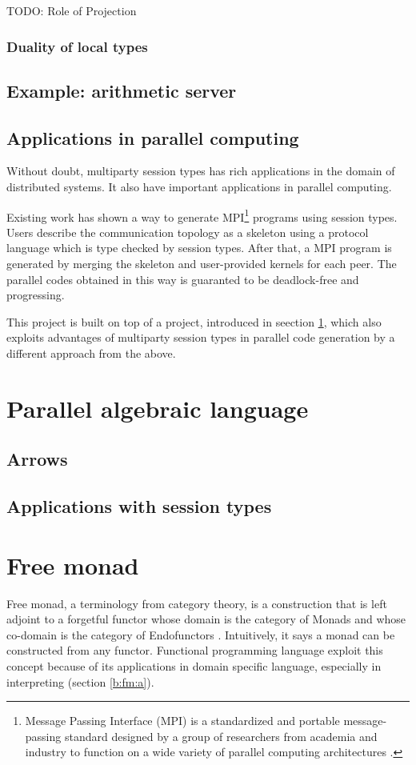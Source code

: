 TODO: Role of Projection
\subsubsection{Duality of local types}
\subsection{Example: arithmetic server}
\subsection{Applications in parallel computing}
Without doubt, multiparty session types has rich applications in the domain of distributed systems. It also have important applications in parallel computing. 

Existing work\cite{ngSafeMPICode} has shown a way to generate MPI\footnote{Message Passing Interface (MPI) is a standardized and portable message-passing standard designed by a group of researchers from academia and industry to function on a wide variety of parallel computing architectures \cite{MessagePassingInterface2018}.} programs using session types. Users describe the communication topology as a skeleton using a protocol language which is type checked by session types. After that, a MPI program is generated by merging the skeleton and user-provided kernels for each peer. The parallel codes obtained in this way is guaranted to be deadlock-free and progressing. 

This project is built on top of a project, introduced in seection \ref{b:pal}, which also exploits advantages of multiparty session types in parallel code generation by a different approach from the above.
\section{Parallel algebraic language} \label{b:pal}
\subsection{Arrows}
\subsection{Applications with session types}
\section{Free monad}
Free monad, a terminology from category theory, is a construction that is left adjoint to a forgetful functor whose domain is the category of Monads and whose co-domain is the category of Endofunctors \cite{contributorsCatsFreeMonads}. Intuitively, it says a monad can be constructed from any functor. Functional programming language exploit this concept because of its applications in domain specific language, especially in interpreting (section \ref{b:fm:a}).
